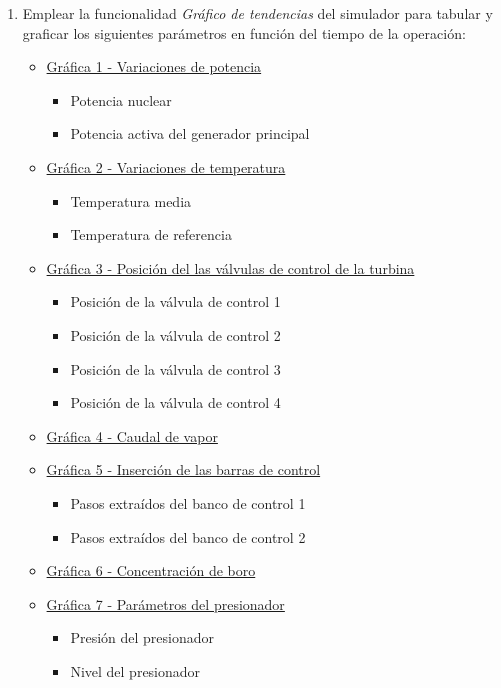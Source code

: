 \begin{enumerate}
  \item Emplear la funcionalidad \textit{Gráfico de tendencias} del simulador para tabular y graficar los siguientes parámetros en función del tiempo de la operación:
    \begin{itemize}
      \item \underline{Gráfica 1 - Variaciones de potencia}
      \begin{itemize}
        \item Potencia nuclear
        \item Potencia activa del generador principal
      \end{itemize}
      \item \underline{Gráfica 2 - Variaciones de temperatura}
      \begin{itemize}
        \item Temperatura media
        \item Temperatura de referencia
      \end{itemize}
      \item \underline{Gráfica 3 - Posición del las válvulas de control de la turbina}
      \begin{itemize}
        \item Posición de la válvula de control 1
        \item Posición de la válvula de control 2
        \item Posición de la válvula de control 3
        \item Posición de la válvula de control 4
      \end{itemize}
      \item \underline{Gráfica 4 - Caudal de vapor}
      \item \underline{Gráfica 5 - Inserción de las barras de control}
      \begin{itemize}
        \item Pasos extraídos del banco de control 1
        \item Pasos extraídos del banco de control 2
      \end{itemize}
      \item \underline{Gráfica 6 - Concentración de boro}
      \item \underline{Gráfica 7 - Parámetros del presionador}
      \begin{itemize}
        \item Presión del presionador
        \item Nivel del presionador 

\end{itemize}
\end{itemize}
\end{enumerate}
